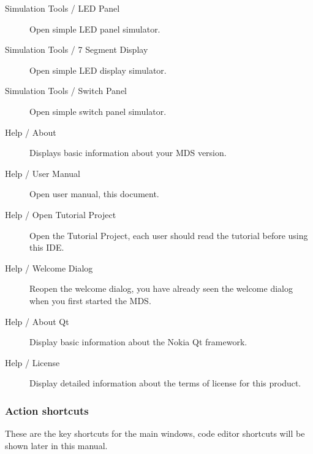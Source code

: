 \begin{description}
            \item[Simulation Tools / LED Panel] Open simple LED panel simulator.
            \item[Simulation Tools / 7 Segment Display] Open simple LED display simulator.
            \item[Simulation Tools / Switch Panel] Open simple switch panel simulator.

            \item[Help / About] Displays basic information about your MDS version.
            \item[Help / User Manual] Open user manual, this document.
            \item[Help / Open Tutorial Project] Open the Tutorial Project, each user should read the tutorial before using this IDE.
            \item[Help / Welcome Dialog] Reopen the welcome dialog, you have already seen the welcome dialog when you first started the MDS.
            \item[Help / About Qt] Display basic information about the Nokia Qt framework.
            \item[Help / License] Display detailed information about the terms of license for this product.
        \end{description}

        \subsubsection{Action shortcuts}
            These are the key shortcuts for the main windows, code editor shortcuts will be shown later in this manual.

